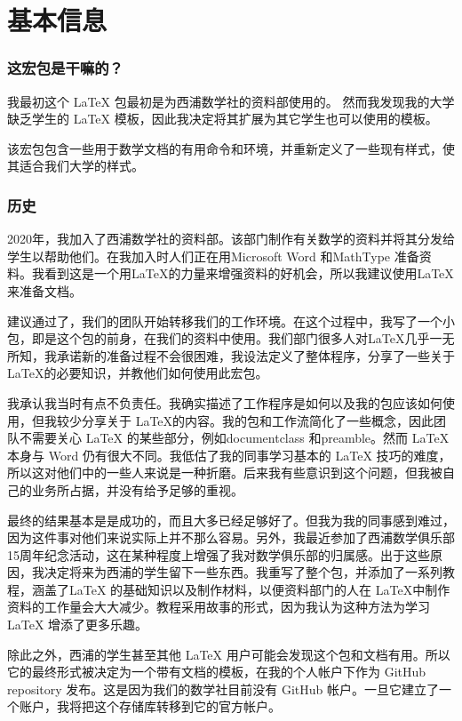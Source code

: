 \part{基本信息}
\pagestyle{headings}
\section{这宏包是干嘛的？}
我最初这个 \LaTeX{} 包最初是为西浦数学社的资料部使用的。 然而我发现我的大学缺乏学生的 \LaTeX{} 模板，因此我决定将其扩展为其它学生也可以使用的模板。

该宏包包含一些用于数学文档的有用命令和环境，并重新定义了一些现有样式，使其适合我们大学的样式。 

\section{历史}
2020年，我加入了西浦数学社的资料部。该部门制作有关数学的资料并将其分发给学生以帮助他们。在我加入时人们正在用Microsoft Word 和MathType 准备资料。我看到这是一个用\LaTeX 的力量来增强资料的好机会，所以我建议使用\LaTeX 来准备文档。

建议通过了，我们的团队开始转移我们的工作环境。在这个过程中，我写了一个小包，即是这个包的前身，在我们的资料中使用。我们部门很多人对\LaTeX{}几乎一无所知，我承诺新的准备过程不会很困难，我设法定义了整体程序，分享了一些关于\LaTeX 的必要知识，并教他们如何使用此宏包。

我承认我当时有点不负责任。我确实描述了工作程序是如何以及我的包应该如何使用，但我较少分享关于 \LaTeX 的内容。我的包和工作流简化了一些概念，因此团队不需要关心 \LaTeX{} 的某些部分，例如documentclass 和preamble。然而 \LaTeX{} 本身与 Word 仍有很大不同。我低估了我的同事学习基本的 \LaTeX{} 技巧的难度，所以这对他们中的一些人来说是一种折磨。后来我有些意识到这个问题，但我被自己的业务所占据，并没有给予足够的重视。

最终的结果基本是是成功的，而且大多已经足够好了。但我为我的同事感到难过，因为这件事对他们来说实际上并不那么容易。另外，我最近参加了西浦数学俱乐部15周年纪念活动，这在某种程度上增强了我对数学俱乐部的归属感。出于这些原因，我决定将来为西浦的学生留下一些东西。我重写了整个包，并添加了一系列教程，涵盖了\LaTeX{} 的基础知识以及制作材料，以便资料部门的人在 \LaTeX 中制作资料的工作量会大大减少。教程采用故事的形式，因为我认为这种方法为学习\LaTeX{} 增添了更多乐趣。

除此之外，西浦的学生甚至其他 \LaTeX{} 用户可能会发现这个包和文档有用。所以它的最终形式被决定为一个带有文档的模板，在我的个人帐户下作为 GitHub repository 发布。这是因为我们的数学社目前没有 GitHub 帐户。一旦它建立了一个账户，我将把这个存储库转移到它的官方帐户。

